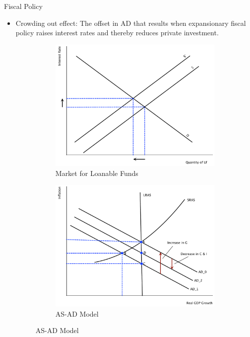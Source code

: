 \documentclass[xcolor={dvipsnames},pdf, hyperref={colorlinks=true, citecolor=ForestGreen, linkcolor=BlueViolet, urlcolor=Magenta}]{beamer}
\theoremstyle{definition}
\begin{document}
\begin{frame}{Fiscal Policy}
	\begin{itemize}
		
		\item Crowding out effect: The offset in AD that results when expansionary fiscal policy raises interest rates and thereby reduces private investment.
		
		
	\begin{figure}[H]
		\centering
		\caption{Crowding Out}
		\begin{subfigure}{.42\textwidth}
			\includegraphics[scale=.25]{plot92.pdf}
			\caption{Market for Loanable Funds}
		\end{subfigure}%
		\begin{subfigure}{.42\textwidth}
			\centering
			\includegraphics[scale=.25]{plot106.pdf}
			\caption{AS-AD Model}
		\end{subfigure}
	\end{figure}
	\end{itemize}
\end{frame}
\end{document}
